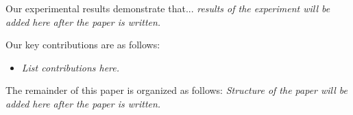 Our experimental results demonstrate that... \textit{results of the experiment will be added here after the paper is written.}

Our key contributions are as follows: %
\begin{itemize}
	\item \textit{List contributions here.}
\end{itemize}


The remainder of this paper is organized as follows:
\textit{Structure of the paper will be added here after the paper is written.}
